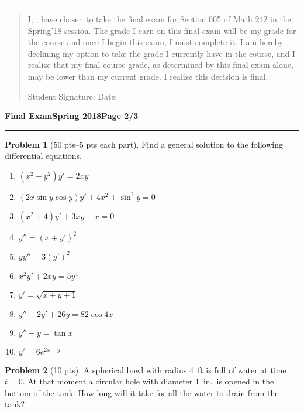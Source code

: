 \documentclass[12pt]{article}
\theoremstyle{definition}
\newtheorem{problem}{Problem}
\begin{document}
\hrule

\vspace{0.6cm}

\begin{quotation}
\noindent I, \makebox[8cm]{\hrulefill}, have chosen to take the final exam for Section 005 of Math 242 in the Spring'18 session.  The grade I earn on this final exam will be my grade for the course and once I begin this exam, I must complete it.  I am hereby declining my option to take the grade I currently have in the course, and I realize that my final course grade, as determined by this final exam alone, may be lower than my current grade.  I realize this decision is final.

\vspace{1cm}

\noindent Student Signature: \makebox[8cm]{\hrulefill} Date: \makebox[3cm]{\hrulefill}


\end{quotation}
\newpage

\hfill{\large\bf Final Exam}\hfill{\large\bf Spring 2018}\hfill{\large\bf Page 2/3}\hrule

\bigskip
\begin{problem}[50 pts--5 pts each part]
Find a general solution to the following differential equations.
\begin{enumerate}
\item $(x^2-y^2)y'=2xy$
\item $(2x\sin y \cos y )y'+4x^2+\sin^2 y = 0$
\item $(x^2+4)y'+3xy-x=0$
\item $y''=(x+y')^2$
\item $yy''=3(y')^2$
\item $x^2y'+2xy=5y^4$
\item $y'=\sqrt{x+y+1}$
\item $y''+2y'+26y=82\cos 4x$
\item $y''+y=\tan x$
\item $y'=6e^{2x-y}$
\end{enumerate}
\end{problem}

\begin{problem}[10 pts]
A spherical bowl with radius 4~ft is full of water at time $t=0$.  At that moment a circular hole with diameter 1~in.~is opened in the bottom of the tank.  How long will it take for all the water to drain from the tank?
\end{problem}
\end{document}
